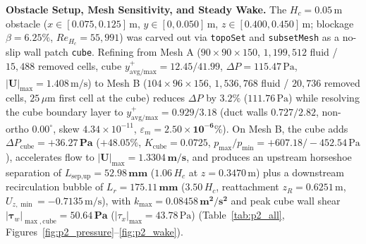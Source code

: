 \documentclass[10pt,a4paper]{article}
\begin{document}
\textbf{Obstacle Setup, Mesh Sensitivity, and Steady Wake.} The $H_c = 0.05\,\text{m}$ obstacle ($x\in[0.075,0.125]\,\text{m}$, $y\in[0,0.050]\,\text{m}$, $z\in[0.400,0.450]\,\text{m}$; blockage $\beta = 6.25\%$, $Re_{H_c} = 55{,}991$) was carved out via \texttt{topoSet} and \texttt{subsetMesh} as a no-slip wall patch \texttt{cube}. Refining from Mesh A ($90\times 90\times 150$, $1{,}199{,}512$ fluid / $15{,}488$ removed cells, cube $y^+_{\text{avg/max}} = 12.45/41.99$, $\Delta P = 115.47\,\text{Pa}$, $|\mathbf{U}|_{\max} = 1.408\,\text{m/s}$) to Mesh B ($104\times 96\times 156$, $1{,}536{,}768$ fluid / $20{,}736$ removed cells, $25\,\mu\text{m}$ first cell at the cube) reduces $\Delta P$ by $3.2\%$ ($111.76\,\text{Pa}$) while resolving the cube boundary layer to $y^+_{\text{avg/max}} = \mathbf{0.929}/\mathbf{3.18}$ (duct walls $0.727/2.82$, non-ortho $0.00^\circ$, skew $4.34\times 10^{-11}$, $\varepsilon_m = \mathbf{2.50\times 10^{-6}\%}$). On Mesh B, the cube adds $\Delta P_{\text{cube}} = \mathbf{+36.27\,\text{Pa}}$ ($+48.05\%$, $K_{\text{cube}} = 0.0725$, $p_{\max}/p_{\min} = +607.18/{-}452.54\,\text{Pa}$), accelerates flow to $|\mathbf{U}|_{\max} = \mathbf{1.3304\,\text{m/s}}$, and produces an upstream horseshoe separation of $L_{\text{sep,up}} = \mathbf{52.98\,\text{mm}}$ ($1.06\,H_c$ at $z = 0.3470\,\text{m}$) plus a downstream recirculation bubble of $L_r = \mathbf{175.11\,\text{mm}}$ ($3.50\,H_c$, reattachment $z_R = 0.6251\,\text{m}$, $U_{z,\min} = -0.7135\,\text{m/s}$), with $k_{\max} = \mathbf{0.08458\,\text{m}^2/\text{s}^2}$ and peak cube wall shear $|\boldsymbol{\tau}_w|_{\max,\text{cube}} = \mathbf{50.64\,\text{Pa}}$ ($|\tau_x|_{\max} = 43.78\,\text{Pa}$) (Table~\ref{tab:p2_all}, Figures~\ref{fig:p2_pressure}--\ref{fig:p2_wake}).
\end{document}
